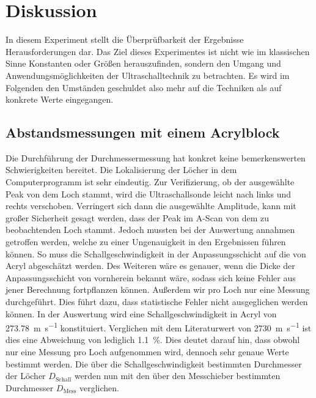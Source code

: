 %

%
\section{Diskussion}
\label{sec:Diskussion}

In diesem Experiment stellt die Überprüfbarkeit der Ergebnisse Herausforderungen dar. 
Das Ziel dieses Experimentes ist nicht wie im klassischen Sinne Konstanten oder Größen 
herauszufinden, sondern den Umgang und Anwendungsmöglichkeiten der Ultraschalltechnik 
zu betrachten. Es wird im Folgenden den Umständen geschuldet also mehr auf die 
Techniken als auf konkrete Werte eingegangen. 

\subsection{Abstandsmessungen mit einem Acrylblock}
Die Durchführung der Durchmessermessung hat konkret keine bemerkenswerten Schwierigkeiten 
bereitet. Die Lokalisierung der Löcher in dem Computerprogramm ist sehr eindeutig. Zur 
Verifizierung, ob der ausgewählte Peak von dem Loch stammt, wird die Ultraschallsonde 
leicht nach links und rechts verschoben. Verringert sich dann die  ausgewählte Amplitude, 
kann mit großer Sicherheit gesagt werden, dass der Peak im A-Scan von dem zu beobachtenden 
Loch stammt. Jedoch mussten bei der Auswertung annahmen getroffen werden, welche zu einer 
Ungenauigkeit in den Ergebnissen führen können. So muss die Schallgeschwindigkeit in der 
Anpassungsschicht auf die von Acryl abgeschätzt werden. Des Weiteren wäre es genauer, wenn 
die Dicke der Anpassungsschicht von vornherein bekannt wäre, sodass sich keine Fehler aus 
jener Berechnung fortpflanzen können. Außerdem wir pro Loch nur eine Messung durchgeführt. 
Dies führt dazu, dass statistische Fehler nicht ausgeglichen werden können. In der Auswertung 
wird eine Schallgeschwindigkeit in Acryl von \qty{273,78}{\meter \per \second} konstituiert. 
Verglichen mit dem Literaturwert von \qty{2730}{\meter\per\second} ist dies eine Abweichung 
von lediglich \qty{1,1}{\percent}. Dies deutet darauf hin, dass obwohl nur eine Messung pro 
Loch aufgenommen wird, dennoch sehr genaue Werte bestimmt werden. Die über die 
Schallgeschwindigkeit bestimmten Durchmesser der Löcher $D_\text{Schall}$ werden nun mit den 
über den Messchieber bestimmten Durchmesser $D_\text{Mess}$ verglichen.

